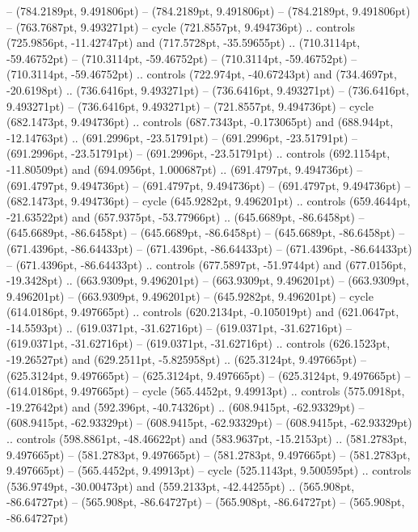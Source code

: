  -- (784.2189pt, 9.491806pt)
 -- (784.2189pt, 9.491806pt)
 -- (784.2189pt, 9.491806pt)
 -- (763.7687pt, 9.493271pt) -- cycle
(721.8557pt, 9.494736pt) .. controls (725.9856pt, -11.42747pt) and (717.5728pt, -35.59655pt) .. (710.3114pt, -59.46752pt)
 -- (710.3114pt, -59.46752pt)
 -- (710.3114pt, -59.46752pt)
 -- (710.3114pt, -59.46752pt) .. controls (722.974pt, -40.67243pt) and (734.4697pt, -20.6198pt) .. (736.6416pt, 9.493271pt)
 -- (736.6416pt, 9.493271pt)
 -- (736.6416pt, 9.493271pt)
 -- (736.6416pt, 9.493271pt)
 -- (721.8557pt, 9.494736pt) -- cycle
(682.1473pt, 9.494736pt) .. controls (687.7343pt, -0.173065pt) and (688.944pt, -12.14763pt) .. (691.2996pt, -23.51791pt)
 -- (691.2996pt, -23.51791pt)
 -- (691.2996pt, -23.51791pt)
 -- (691.2996pt, -23.51791pt) .. controls (692.1154pt, -11.80509pt) and (694.0956pt, 1.000687pt) .. (691.4797pt, 9.494736pt)
 -- (691.4797pt, 9.494736pt)
 -- (691.4797pt, 9.494736pt)
 -- (691.4797pt, 9.494736pt)
 -- (682.1473pt, 9.494736pt) -- cycle
(645.9282pt, 9.496201pt) .. controls (659.4644pt, -21.63522pt) and (657.9375pt, -53.77966pt) .. (645.6689pt, -86.6458pt)
 -- (645.6689pt, -86.6458pt)
 -- (645.6689pt, -86.6458pt)
 -- (645.6689pt, -86.6458pt)
 -- (671.4396pt, -86.64433pt)
 -- (671.4396pt, -86.64433pt)
 -- (671.4396pt, -86.64433pt)
 -- (671.4396pt, -86.64433pt) .. controls (677.5897pt, -51.9744pt) and (677.0156pt, -19.3428pt) .. (663.9309pt, 9.496201pt)
 -- (663.9309pt, 9.496201pt)
 -- (663.9309pt, 9.496201pt)
 -- (663.9309pt, 9.496201pt)
 -- (645.9282pt, 9.496201pt) -- cycle
(614.0186pt, 9.497665pt) .. controls (620.2134pt, -0.105019pt) and (621.0647pt, -14.5593pt) .. (619.0371pt, -31.62716pt)
 -- (619.0371pt, -31.62716pt)
 -- (619.0371pt, -31.62716pt)
 -- (619.0371pt, -31.62716pt) .. controls (626.1523pt, -19.26527pt) and (629.2511pt, -5.825958pt) .. (625.3124pt, 9.497665pt)
 -- (625.3124pt, 9.497665pt)
 -- (625.3124pt, 9.497665pt)
 -- (625.3124pt, 9.497665pt)
 -- (614.0186pt, 9.497665pt) -- cycle
(565.4452pt, 9.49913pt) .. controls (575.0918pt, -19.27642pt) and (592.396pt, -40.74326pt) .. (608.9415pt, -62.93329pt)
 -- (608.9415pt, -62.93329pt)
 -- (608.9415pt, -62.93329pt)
 -- (608.9415pt, -62.93329pt) .. controls (598.8861pt, -48.46622pt) and (583.9637pt, -15.2153pt) .. (581.2783pt, 9.497665pt)
 -- (581.2783pt, 9.497665pt)
 -- (581.2783pt, 9.497665pt)
 -- (581.2783pt, 9.497665pt)
 -- (565.4452pt, 9.49913pt) -- cycle
(525.1143pt, 9.500595pt) .. controls (536.9749pt, -30.00473pt) and (559.2133pt, -42.44255pt) .. (565.908pt, -86.64727pt)
 -- (565.908pt, -86.64727pt)
 -- (565.908pt, -86.64727pt)
 -- (565.908pt, -86.64727pt)
